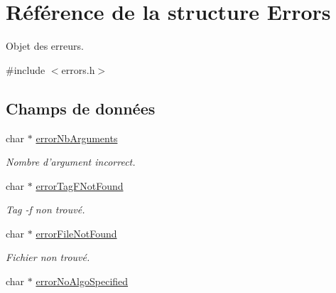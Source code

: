 \hypertarget{structErrors}{
\section{Référence de la structure Errors}
\label{structErrors}
}


Objet des erreurs.  




{\ttfamily \#include $<$errors.h$>$}

\subsection*{Champs de données}
\begin{DoxyCompactItemize}
\item 
\hypertarget{structErrors_add18d77e05e1b61b88feeb2d5bdf5525}{
char $\ast$ \hyperlink{structErrors_add18d77e05e1b61b88feeb2d5bdf5525}{errorNbArguments}}
\label{structErrors_add18d77e05e1b61b88feeb2d5bdf5525}

\begin{DoxyCompactList}\small\item\em Nombre d'argument incorrect. \item\end{DoxyCompactList}\item 
\hypertarget{structErrors_ae16317e85c4bbd2d2f8aa0412e87790f}{
char $\ast$ \hyperlink{structErrors_ae16317e85c4bbd2d2f8aa0412e87790f}{errorTagFNotFound}}
\label{structErrors_ae16317e85c4bbd2d2f8aa0412e87790f}

\begin{DoxyCompactList}\small\item\em Tag -\/f non trouvé. \item\end{DoxyCompactList}\item 
\hypertarget{structErrors_a7133eba5ff36c1f6d71a6cd2bcc0e8b1}{
char $\ast$ \hyperlink{structErrors_a7133eba5ff36c1f6d71a6cd2bcc0e8b1}{errorFileNotFound}}
\label{structErrors_a7133eba5ff36c1f6d71a6cd2bcc0e8b1}

\begin{DoxyCompactList}\small\item\em Fichier non trouvé. \item\end{DoxyCompactList}\item 
\hypertarget{structErrors_a23cf6180d45a3075891ab189d0eb9023}{
char $\ast$ \hyperlink{structErrors_a23cf6180d45a3075891ab189d0eb9023}{errorNoAlgoSpecified}}
\label{structErrors_a23cf6180d45a3075891ab189d0eb9023}


\end{DoxyCompactItemize}
